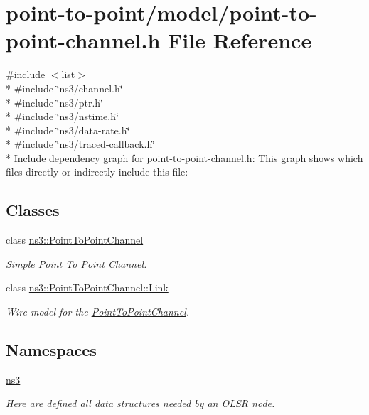 \hypertarget{point-to-point-channel_8h}{}\section{point-\/to-\/point/model/point-\/to-\/point-\/channel.h File Reference}
\label{point-to-point-channel_8h}
{\ttfamily \#include $<$list$>$}\\*
{\ttfamily \#include \char`\"{}ns3/channel.\+h\char`\"{}}\\*
{\ttfamily \#include \char`\"{}ns3/ptr.\+h\char`\"{}}\\*
{\ttfamily \#include \char`\"{}ns3/nstime.\+h\char`\"{}}\\*
{\ttfamily \#include \char`\"{}ns3/data-\/rate.\+h\char`\"{}}\\*
{\ttfamily \#include \char`\"{}ns3/traced-\/callback.\+h\char`\"{}}\\*
Include dependency graph for point-\/to-\/point-\/channel.h\+:
This graph shows which files directly or indirectly include this file\+:
\subsection*{Classes}
\begin{DoxyCompactItemize}
\item 
class \hyperlink{classns3_1_1PointToPointChannel}{ns3\+::\+Point\+To\+Point\+Channel}
\begin{DoxyCompactList}\small\item\em Simple Point To Point \hyperlink{classns3_1_1Channel}{Channel}. \end{DoxyCompactList}\item 
class \hyperlink{classns3_1_1PointToPointChannel_1_1Link}{ns3\+::\+Point\+To\+Point\+Channel\+::\+Link}
\begin{DoxyCompactList}\small\item\em Wire model for the \hyperlink{classns3_1_1PointToPointChannel}{Point\+To\+Point\+Channel}. \end{DoxyCompactList}\end{DoxyCompactItemize}
\subsection*{Namespaces}
\begin{DoxyCompactItemize}
\item 
 \hyperlink{namespacens3}{ns3}
\begin{DoxyCompactList}\small\item\em Here are defined all data structures needed by an O\+L\+SR node. \end{DoxyCompactList}\end{DoxyCompactItemize}
